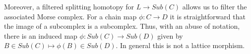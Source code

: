 %
%
%
%
%
%

Moreover, a filtered splitting homotopy for $L\to Sub(C)$ allows us to filter the associated Morse complex.  For a chain map $\phi:C\to D$ it is straightforward that the image of a subcomplex is a subcomplex.  Thus, with an abuse of notation, there is an induced map $\phi:Sub(C)\to Sub(D)$ given by $B\in Sub(C)\mapsto \phi(B)\in Sub(D)$.  In general this is not a lattice morphism.

